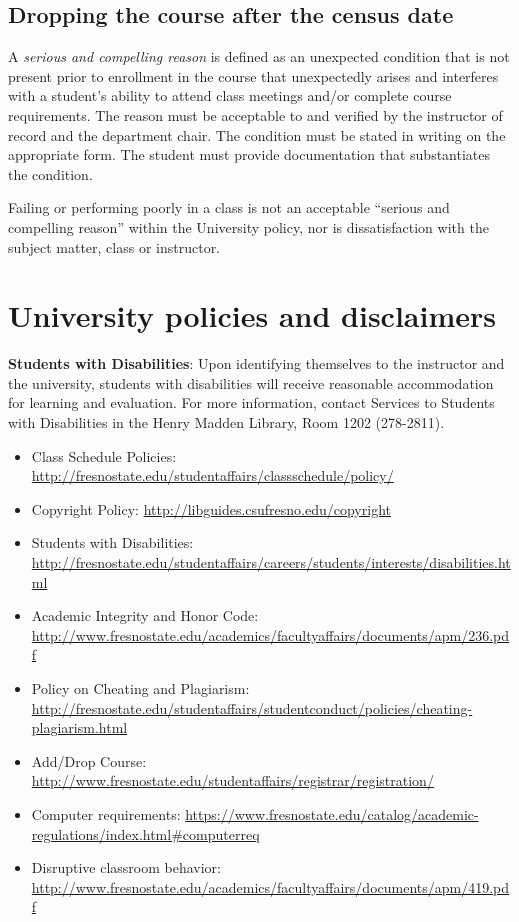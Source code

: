 \hypertarget{dropping-the-course-after-the-census-date}{%
\subsection{Dropping the course after the census
date}\label{dropping-the-course-after-the-census-date}}

A \emph{serious and compelling reason} is defined as an unexpected
condition that is not present prior to enrollment in the course that
unexpectedly arises and interferes with a student's ability to attend
class meetings and/or complete course requirements. The reason must be
acceptable to and verified by the instructor of record and the
department chair. The condition must be stated in writing on the
appropriate form. The student must provide documentation that
substantiates the condition.

Failing or performing poorly in a class is not an acceptable ``serious
and compelling reason'' within the University policy, nor is
dissatisfaction with the subject matter, class or instructor.

\hypertarget{university-policies-and-disclaimers}{%
\section{University policies and
disclaimers}\label{university-policies-and-disclaimers}}

\textbf{Students with Disabilities}: Upon identifying themselves to the
instructor and the university, students with disabilities will receive
reasonable accommodation for learning and evaluation. For more
information, contact Services to Students with Disabilities in the Henry
Madden Library, Room 1202 (278-2811).

\begin{itemize}
\tightlist
\item
  Class Schedule Policies:
  \url{http://fresnostate.edu/studentaffairs/classschedule/policy/}
\item
  Copyright Policy: \url{http://libguides.csufresno.edu/copyright}
\item
  Students with Disabilities:
  \url{http://fresnostate.edu/studentaffairs/careers/students/interests/disabilities.html}
\item
  Academic Integrity and Honor Code:
  \url{http://www.fresnostate.edu/academics/facultyaffairs/documents/apm/236.pdf}
\item
  Policy on Cheating and Plagiarism:
  \url{http://fresnostate.edu/studentaffairs/studentconduct/policies/cheating-plagiarism.html}
\item
  Add/Drop Course:
  \url{http://www.fresnostate.edu/studentaffairs/registrar/registration/}
\item
  Computer requirements:
  \url{https://www.fresnostate.edu/catalog/academic-regulations/index.html\#computerreq}
\item
  Disruptive classroom behavior:
  \url{http://www.fresnostate.edu/academics/facultyaffairs/documents/apm/419.pdf}
\end{itemize}

